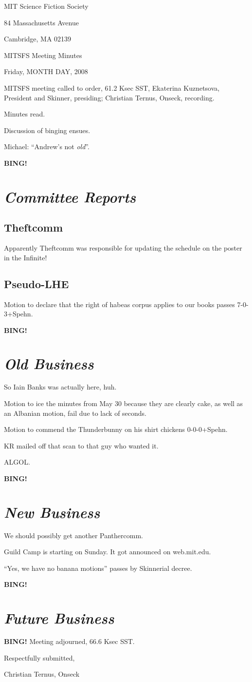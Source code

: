 \documentclass[10pt]{article}
\newcommand{\bing}{{\bf BING!} }
\newcommand{\goto}[1]{\bing \vskip 12pt \section*{{\em{#1}}}}
\begin{document}
\begin{center}

MIT Science Fiction Society

84 Massachusetts Avenue

Cambridge, MA 02139

\vspace{12pt}

MITSFS Meeting Minutes

Friday, MONTH DAY, 2008

\end{center}

\vspace{18pt}

\setlength{\parskip}{6pt}

\noindent
MITSFS meeting called to order, 61.2 Ksec SST,
Ekaterina Kuznetsova, President and Skinner, presiding; Christian Ternus, Onseck, recording.

Minutes read.

Discussion of binging ensues.

Michael:  ``Andrew's not \emph{old}''.

\BING

\goto{Committee Reports}

\subsection*{Theftcomm}

Apparently Theftcomm was responsible for updating the schedule on the
poster in the Infinite!

\subsection*{Pseudo-LHE}

Motion to declare that the right of habeas corpus applies to our books passes 7-0-3+Spehn.

\goto{Old Business}

So Iain Banks was actually here, huh.

Motion to ice the minutes from May 30 because they are clearly cake,
as well as an Albanian motion, fail due to lack of seconds.

Motion to commend the Thunderbunny on his shirt chickens 0-0-0+Spehn.

KR mailed off that scan to that guy who wanted it.

ALGOL.

\goto{New Business}

We should possibly get another Panthercomm.
  
Guild Camp is starting on Sunday.  It got announced on web.mit.edu.

``Yes, we have no banana motions'' passes by Skinnerial decree.

\goto{Future Business}

\bing
\noindent
Meeting adjourned, 66.6 Ksec SST.

\vspace{18pt}

\centerline{Respectfully submitted,}
\centerline{Christian Ternus, Onseck}
\end{document}
